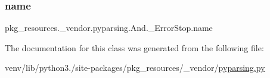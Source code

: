 \subsubsection{\texorpdfstring{name}{name}}
{\footnotesize\ttfamily pkg\+\_\+resources.\+\_\+vendor.\+pyparsing.\+And.\+\_\+\+Error\+Stop.\+name}



The documentation for this class was generated from the following file\+:\begin{DoxyCompactItemize}
\item 
venv/lib/python3./site-\/packages/pkg\+\_\+resources/\+\_\+vendor/\hyperlink{pkg__resources_2__vendor_2pyparsing_8py}{pyparsing.\+py}\end{DoxyCompactItemize}
